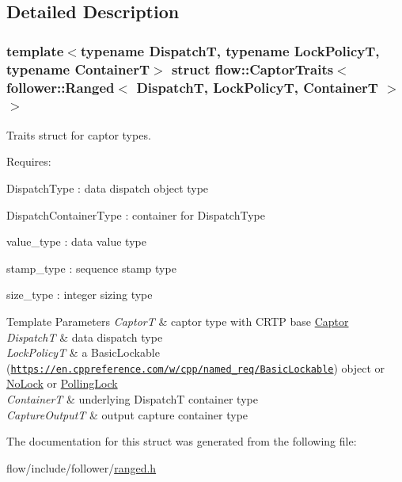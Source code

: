 \subsection{Detailed Description}
\subsubsection*{template$<$typename DispatchT, typename Lock\+PolicyT, typename ContainerT$>$\newline
struct flow\+::\+Captor\+Traits$<$ follower\+::\+Ranged$<$ Dispatch\+T, Lock\+Policy\+T, Container\+T $>$ $>$}

Traits struct for captor types. 

Requires\+:
\begin{DoxyItemize}
\item {\ttfamily Dispatch\+Type} \+: data dispatch object type
\item {\ttfamily Dispatch\+Container\+Type} \+: container for {\ttfamily Dispatch\+Type}
\item {\ttfamily value\+\_\+type} \+: data value type
\item {\ttfamily stamp\+\_\+type} \+: sequence stamp type
\item {\ttfamily size\+\_\+type} \+: integer sizing type
\end{DoxyItemize}


\begin{DoxyTemplParams}{Template Parameters}
{\em CaptorT} & captor type with C\+R\+TP base {\ttfamily \hyperlink{classflow_1_1_captor}{Captor}}\\
\hline
{\em DispatchT} & data dispatch type \\
\hline
{\em Lock\+PolicyT} & a Basic\+Lockable (\href{https://en.cppreference.com/w/cpp/named_req/BasicLockable}{\tt https\+://en.\+cppreference.\+com/w/cpp/named\+\_\+req/\+Basic\+Lockable}) object or \hyperlink{structflow_1_1_no_lock}{No\+Lock} or \hyperlink{structflow_1_1_polling_lock}{Polling\+Lock} \\
\hline
{\em ContainerT} & underlying {\ttfamily DispatchT} container type \\
\hline
{\em Capture\+OutputT} & output capture container type \\
\hline
\end{DoxyTemplParams}


The documentation for this struct was generated from the following file\+:\begin{DoxyCompactItemize}
\item 
flow/include/follower/\hyperlink{ranged_8h}{ranged.\+h}\end{DoxyCompactItemize}
